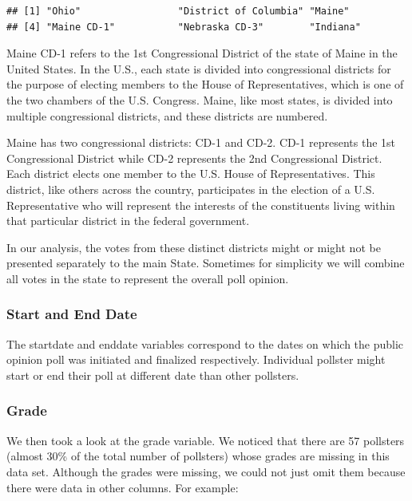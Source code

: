 \documentclass[
  11pt,
]{article}
\begin{document}
\begin{verbatim}
## [1] "Ohio"                 "District of Columbia" "Maine"               
## [4] "Maine CD-1"           "Nebraska CD-3"        "Indiana"
\end{verbatim}

Maine CD-1 refers to the 1st Congressional District of the state of
Maine in the United States. In the U.S., each state is divided into
congressional districts for the purpose of electing members to the House
of Representatives, which is one of the two chambers of the U.S.
Congress. Maine, like most states, is divided into multiple
congressional districts, and these districts are numbered.

Maine has two congressional districts: CD-1 and CD-2. CD-1 represents
the 1st Congressional District while CD-2 represents the 2nd
Congressional District. Each district elects one member to the U.S.
House of Representatives. This district, like others across the country,
participates in the election of a U.S. Representative who will represent
the interests of the constituents living within that particular district
in the federal government.

In our analysis, the votes from these distinct districts might or might
not be presented separately to the main State. Sometimes for simplicity
we will combine all votes in the state to represent the overall poll
opinion.

\hypertarget{start-and-end-date}{%
\subsubsection{Start and End Date}\label{start-and-end-date}}

The startdate and enddate variables correspond to the dates on which the
public opinion poll was initiated and finalized respectively. Individual
pollster might start or end their poll at different date than other
pollsters.

\hypertarget{grade}{%
\subsubsection{Grade}\label{grade}}

We then took a look at the grade variable. We noticed that there are 57
pollsters (almost 30\% of the total number of pollsters) whose grades
are missing in this data set. Although the grades were missing, we could
not just omit them because there were data in other columns. For
example:
\end{document}
